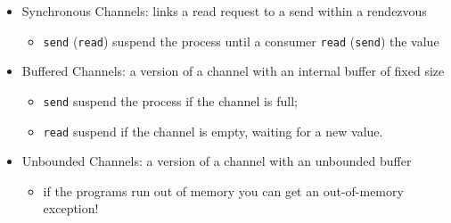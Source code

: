 \documentclass[aspectratio=1610,xcolor=dvipsnames]{beamer}
\begin{document}
\begin{frame}  
  \begin{itemize}
      \item Synchronous Channels: links a read request to a send within a rendezvous
      \begin{itemize}
          \item \texttt{send} (\texttt{read}) suspend the process until a consumer \texttt{read} (\texttt{send}) the value
      \end{itemize}
      \item Buffered Channels: a version of a channel with an internal buffer of fixed size
      \begin{itemize}
          \item \texttt{send} suspend the process if the channel is full;
          \item \texttt{read} suspend if the channel is empty, waiting for a new value.
      \end{itemize}
      \item Unbounded Channels: a version of a channel with an unbounded buffer
      \begin{itemize}
          \item if the programs run out of memory you can get an out-of-memory exception!
      \end{itemize}
  \end{itemize}
\end{frame}

\end{document}
